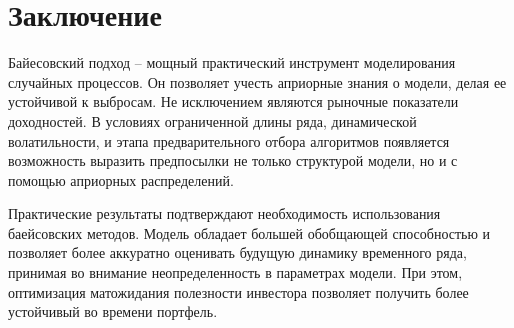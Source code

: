 \chapter{Заключение}
Байесовский подход -- мощный практический инструмент моделирования случайных процессов. Он позволяет учесть априорные знания о модели, делая ее устойчивой к выбросам. Не исключением являются рыночные показатели доходностей. В условиях ограниченной длины ряда, динамической волатильности, и этапа предварительного отбора алгоритмов появляется возможность выразить предпосылки не только структурой модели, но и с помощью априорных распределений.

Практические результаты подтверждают необходимость использования баейсовских методов. Модель обладает большей обобщающей способностью и позволяет более аккуратно оценивать будущую динамику временного ряда, принимая во внимание неопределенность в параметрах модели. При этом, оптимизация матожидания полезности инвестора позволяет получить более устойчивый во времени портфель.

